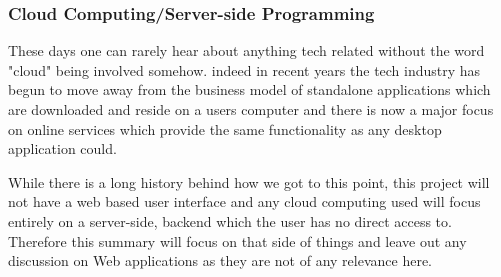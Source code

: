 

\subsubsection{Cloud Computing/Server-side Programming}

These days one can rarely hear about anything tech related without the word "cloud" being involved somehow. indeed in recent years the tech industry has begun to move away from the business model of standalone applications which are downloaded and reside on a users computer and there is now a major focus on online services which provide the same functionality as any desktop application could. 

While there is a long history behind how we got to this point, this project will not have a web based user interface and any cloud computing used will focus entirely on a server-side, backend which the user has no direct access to. Therefore this summary will focus on that side of things and leave out any discussion on Web applications as they are not of any relevance here.

